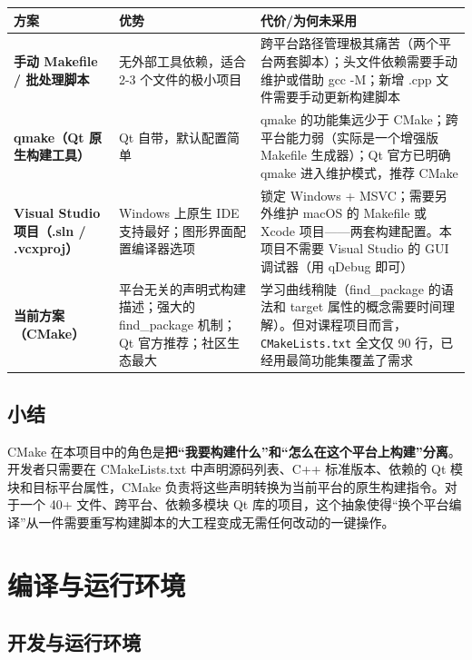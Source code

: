 \documentclass[utf8]{ctexart}
\begin{document}
\begin{longtable}{p{}p{}p{}}
\toprule
\textbf{方案} & \textbf{优势} & \textbf{代价/为何未采用} \\
\midrule
\textbf{手动 Makefile / 批处理脚本} & 无外部工具依赖，适合 2-3 个文件的极小项目 & 跨平台路径管理极其痛苦（两个平台两套脚本）；头文件依赖需要手动维护或借助 gcc -M；新增 .cpp 文件需要手动更新构建脚本 \\
\hline
\textbf{qmake（Qt 原生构建工具）} & Qt 自带，默认配置简单 & qmake 的功能集远少于 CMake；跨平台能力弱（实际是一个增强版 Makefile 生成器）；Qt 官方已明确 qmake 进入维护模式，推荐 CMake \\
\hline
\textbf{Visual Studio 项目（.sln / .vcxproj）} & Windows 上原生 IDE 支持最好；图形界面配置编译器选项 & 锁定 Windows + MSVC；需要另外维护 macOS 的 Makefile 或 Xcode 项目——两套构建配置。本项目不需要 Visual Studio 的 GUI 调试器（用 qDebug 即可） \\
\hline
\textbf{当前方案（CMake）} & 平台无关的声明式构建描述；强大的 find\_package 机制；Qt 官方推荐；社区生态最大 & 学习曲线稍陡（find\_package 的语法和 target 属性的概念需要时间理解）。但对课程项目而言，\texttt{CMakeLists.txt} 全文仅 90 行，已经用最简功能集覆盖了需求 \\
\bottomrule
\end{longtable}

\subsection{小结}

CMake 在本项目中的角色是\textbf{把“我要构建什么”和“怎么在这个平台上构建”分离}。开发者只需要在 CMakeLists.txt 中声明源码列表、C++ 标准版本、依赖的 Qt 模块和目标平台属性，CMake 负责将这些声明转换为当前平台的原生构建指令。对于一个 40+ 文件、跨平台、依赖多模块 Qt 库的项目，这个抽象使得“换个平台编译”从一件需要重写构建脚本的大工程变成无需任何改动的一键操作。

\appendix
\section{编译与运行环境}

\subsection{开发与运行环境}
\end{document}
